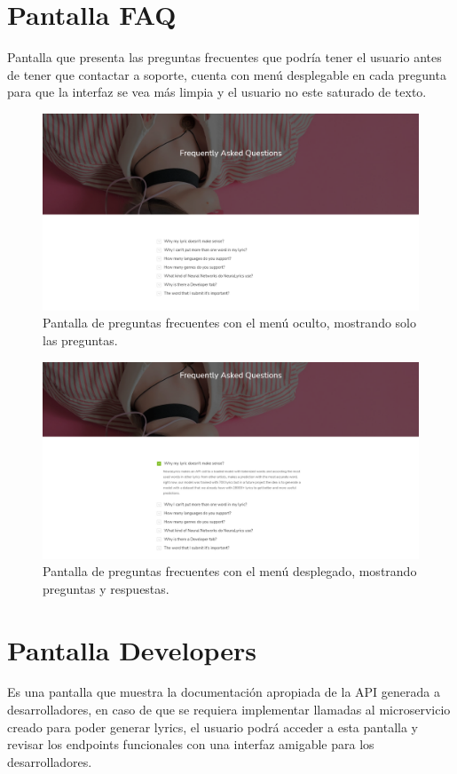 \documentclass[12pt, a4paper, titlepage]{article}
\begin{document}
		\section{Pantalla FAQ}
		Pantalla que presenta las preguntas frecuentes que podría tener el usuario antes de tener que contactar a soporte, cuenta con menú desplegable en cada pregunta para que la interfaz se vea más limpia y el usuario no este saturado de texto.
		
		\begin{figure}[H] 
			\includegraphics[width=13.5cm]{./Imagenes/Capturas/pfaqclose.png}
			\centering \caption{Pantalla de preguntas frecuentes con el menú oculto, mostrando solo las preguntas.}
		\end{figure}
	
		\begin{figure}[H] 
		\includegraphics[width=13.5cm]{./Imagenes/Capturas/pfaqopen.png}
		\centering \caption{Pantalla de preguntas frecuentes con el menú desplegado, mostrando preguntas y respuestas.}
		\end{figure}
	
		\section{Pantalla Developers}
		Es una pantalla que muestra la documentación apropiada de la API generada a desarrolladores, en caso de que se requiera implementar llamadas al microservicio creado para poder generar lyrics, el usuario podrá acceder a esta pantalla y revisar los endpoints funcionales con una interfaz amigable para los desarrolladores.
		
\end{document}
